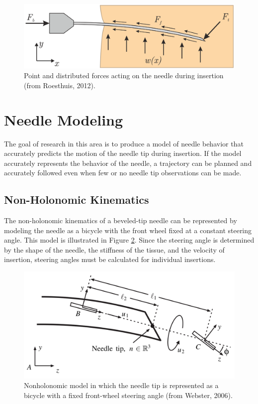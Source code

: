 \begin{figure}[h]
\includegraphics[width=1.0\textwidth]{Fig/chap2/roesthius_needle_forces.png}
\caption{Point and distributed forces acting on the needle during insertion (from Roesthuis, 2012).}
\label{fig:needle_forces}
\end{figure}

\section{Needle Modeling}
The goal of research in this area is to produce a model of needle behavior that accurately predicts the motion of the needle tip during insertion. If the model accurately represents the behavior of the needle, a trajectory can be planned and accurately followed even when few or no needle tip observations can be made.

\subsection{Non-Holonomic Kinematics}
The non-holonomic kinematics of a beveled-tip needle can be represented by modeling the needle as a bicycle with the front wheel fixed at a constant steering angle\cite{webster_nonholonomic_2006,cowan_robotic_2011}. This model is illustrated in Figure \ref{fig:webster_nonholonomic_model}. Since the steering angle is determined by the shape of the needle, the stiffness of the tissue, and the velocity of insertion, steering angles must be calculated for individual insertions. 

\begin{figure}[h]
\includegraphics[width=1.0\textwidth]{Fig/chap2/webster_nonholonomic_model.png}
\caption{Nonholonomic model in which the needle tip is represented as a bicycle with a fixed front-wheel steering angle (from Webster, 2006).}
\label{fig:webster_nonholonomic_model}
\end{figure}


